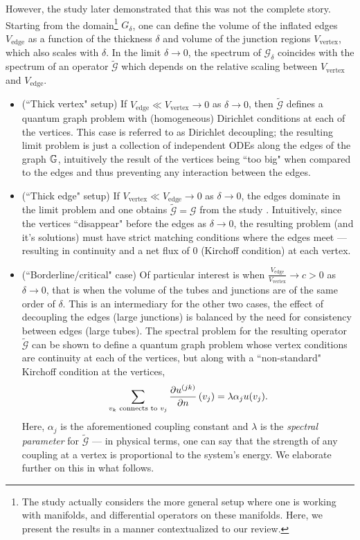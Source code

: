 However, the study \cite{exner2005convergence} later demonstrated that this was not the complete story.
Starting from the domain\footnote{The study \cite{exner2005convergence} actually considers the more general setup where one is working with manifolds, and differential operators on these manifolds. Here, we present the results in a manner contextualized to our review.} $G_{\delta}$, one can define the volume of the inflated edges $V_{\mathrm{edge}}$ as a function of the thickness $\delta$ and volume of the junction regions $V_{\mathrm{vertex}}$, which also scales with $\delta$.
In the limit $\delta\rightarrow0$, the spectrum of $\mathcal{G}_{\delta}$ coincides with the spectrum of an operator $\tilde{\mathcal{G}}$ which depends on the relative scaling between $V_{\mathrm{vertex}}$ and $V_{\mathrm{edge}}$.
\begin{itemize}
	\item (``Thick vertex" setup) If $V_{\mathrm{edge}}\ll V_{\mathrm{vertex}}\rightarrow0$ as $\delta\rightarrow0$, then $\tilde{\mathcal{G}}$ defines a quantum graph problem with (homogeneous) Dirichlet conditions at each of the vertices.
	This case is referred to as Dirichlet decoupling; the resulting limit problem is just a collection of independent ODEs along the edges of the graph $\mathbb{G}$, intuitively the result of the vertices being ``too big" when compared to the edges and thus preventing any interaction between the edges.
	\item (``Thick edge" setup) If $V_{\mathrm{vertex}}\ll V_{\mathrm{edge}}\rightarrow0$ as $\delta\rightarrow0$, the edges dominate in the limit problem and one obtains $\tilde{\mathcal{G}} = \mathcal{G}$ from the study \cite{kuchment2001convergence}.
	Intuitively, since the vertices ``disappear" before the edges as $\delta\rightarrow0$, the resulting problem (and it's solutions) must have strict matching conditions where the edges meet --- resulting in continuity and a net flux of 0 (Kirchoff condition) at each vertex.
	\item (``Borderline/critical" case) Of particular interest is when $\frac{V_{\mathrm{edge}}}{V_{\mathrm{vertex}}}\rightarrow c>0$ as $\delta\rightarrow0$, that is when the volume of the tubes and junctions are of the same order of $\delta$.
	This is an intermediary for the other two cases, the effect of decoupling the edges (large junctions) is balanced by the need for consistency between edges (large tubes).
	The spectral problem for the resulting operator $\tilde{\mathcal{G}}$ can be shown to define a quantum graph problem whose vertex conditions are continuity at each of the vertices, but along with a ``non-standard" Kirchoff condition at the vertices,
	\begin{align*}
	\sum_{v_k \text{ connects to } v_j} 
	\dfrac{\partial u^{(jk)}}{\partial n}\left( v_j \right) = \lambda\alpha_j u(v_j).
	\end{align*}
	Here, $\alpha_j$ is the aforementioned coupling constant and $\lambda$ is the \emph{spectral parameter} for $\tilde{\mathcal{G}}$ --- in physical terms, one can say that the strength of any coupling at a vertex is proportional to the system's energy.
	We elaborate further on this in what follows.
\end{itemize}
